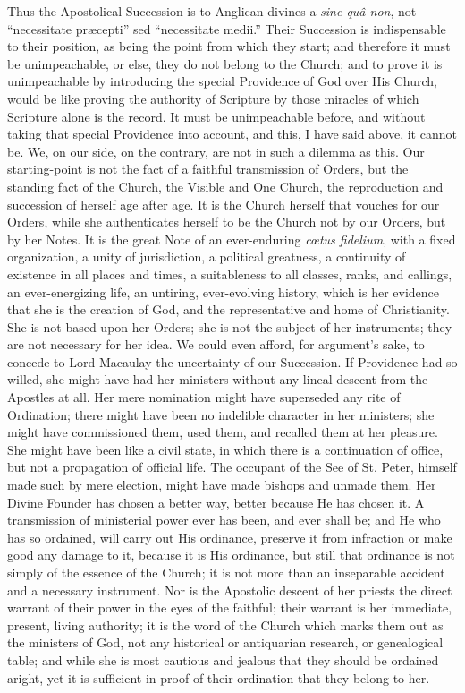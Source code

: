 Thus the Apostolical Succession is to Anglican divines a \emph{sine
quâ non}, not ``necessitate præcepti'' sed
``necessitate medii.'' Their Succession is indispensable to
their position, as being the point from which they start; and therefore it must be unimpeachable, or else, they do not belong to the
Church; and to prove it is unimpeachable by introducing the special
Providence of God over His Church, would be like proving the authority
of Scripture by those miracles of which Scripture alone is the record.
It must be unimpeachable before, and without taking that special
Providence into account, and this, I have said above, it cannot be.
We, on our side, on the contrary, are not in such a dilemma as this.
Our starting-point is not the fact of a faithful transmission of
Orders, but the standing fact of the Church, the Visible and One
Church, the reproduction and succession of herself age after age. It
is the Church herself that vouches for our Orders, while she
authenticates herself to be the Church not by our Orders, but by her
Notes. It is the great Note of an ever-enduring \emph{cœtus fidelium}, with
a fixed organization, a unity of jurisdiction, a political greatness,
a continuity of existence in all places and times, a suitableness to
all classes, ranks, and callings, an ever-energizing life, an
untiring, ever-evolving history, which is her evidence that she is the
creation of God, and the representative and home of Christianity. She
is not based upon her Orders; she is not the subject of her
instruments; they are not necessary for her idea. We could even
afford, for argument's sake, to concede to Lord Macaulay the
uncertainty of our Succession. If Providence had so willed, she might
have had her ministers without any lineal descent from the Apostles at
all. Her mere nomination might have superseded any rite of Ordination;
there might have been no indelible character in her ministers; she
might have commissioned them, used them, and recalled them at her
pleasure. She might have been like a civil state, in which there is a
continuation of office, but not a propagation of official life.
The occupant of the See of St. Peter, himself made such by mere
election, might have made bishops and unmade them. Her Divine Founder
has chosen a better way, better because He has chosen it. A
transmission of ministerial power ever has been, and ever shall be;
and He who has so ordained, will carry out His ordinance, preserve it
from infraction or make good any damage to it, because it is His
ordinance, but still that ordinance is not simply of the essence of
the Church; it is not more than an inseparable accident and a
necessary instrument. Nor is the Apostolic descent of her priests the
direct warrant of their power in the eyes of the faithful; their
warrant is her immediate, present, living authority; it is the word of
the Church which marks them out as the ministers of God, not any
historical or antiquarian research, or genealogical table; and while
she is most cautious and jealous that they should be ordained aright,
yet it is sufficient in proof of their ordination that they belong to
her.

